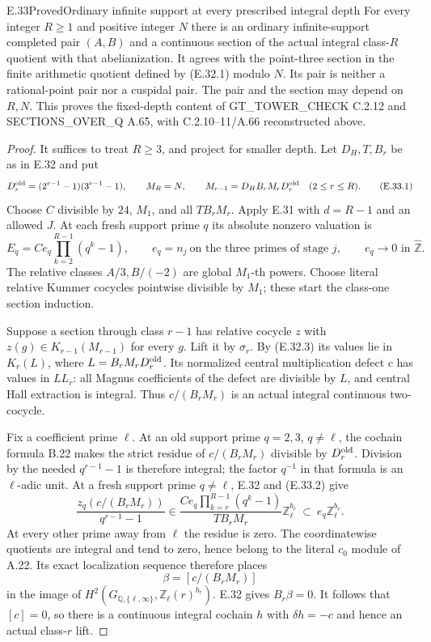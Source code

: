 \begin{result}{E.33}{Proved}{Ordinary infinite support at every prescribed integral depth}
\label{coh:fixed-depth}
For every integer $R\ge1$ and positive integer $N$ there is an ordinary
infinite-support completed pair $(A,B)$ and a continuous section of
the actual integral class-$R$ quotient with that abelianization.
It agrees with the point-three section in the finite arithmetic quotient
defined by (E.32.1) modulo $N$.  Its pair is neither a rational-point
pair nor a cuspidal pair.  The pair and the section may depend on $R,N$.
This proves the fixed-depth content of GT\_TOWER\_CHECK C.2.12 and
SECTIONS\_OVER\_Q A.65, with C.2.10--11/A.66 reconstructed above.
\end{result}
\begin{proof}
It suffices to treat $R\ge3$, and project for smaller depth.  Let
$D_H,T,B_r$ be as in E.32 and put
\[
 D_r^{\rm old}=(2^{r-1}-1)(3^{r-1}-1),\qquad
 M_R=N,\qquad M_{r-1}=D_H B_r M_rD_r^{\rm old}\quad(2\le r\le R).
 \tag{E.33.1}
\]
Choose $C$ divisible by $24$, $M_1$, and all $TB_rM_r$.
Apply E.31 with $d=R-1$ and an allowed $J$.  At each fresh support
prime $q$ its absolute nonzero valuation is
\[
 E_q=C e_q\prod_{k=2}^{R-1}(q^k-1),\qquad
 e_q=n_j\ \text{on the three primes of stage }j,\qquad
 e_q\longrightarrow0\text{ in }\widehat{\mathbb Z}.
 \tag{E.33.2}
\]
The relative classes $A/3,B/(-2)$ are global $M_1$-th powers.  Choose
literal relative Kummer cocycles pointwise divisible by $M_1$;
these start the class-one section induction.

Suppose a section through class $r-1$ has relative cocycle $z$ with
$z(g)\in K_{r-1}(M_{r-1})$ for every $g$.  Lift it by $\sigma_r$.
By (E.32.3) its values lie in $K_r(L)$, where
$L=B_rM_rD_r^{\rm old}$.  Its normalized central multiplication
defect $c$ has values in $LL_r$: all Magnus coefficients of the defect
are divisible by $L$, and central Hall extraction is integral.
Thus $c/(B_rM_r)$ is an actual integral continuous two-cocycle.

Fix a coefficient prime $\ell$.  At an old support prime $q=2,3$,
$q\ne\ell$, the cochain formula B.22 makes the strict residue of
$c/(B_rM_r)$ divisible by $D_r^{\rm old}$.  Division by the needed
$q^{r-1}-1$ is therefore integral; the factor $q^{-1}$ in that formula
is an $\ell$-adic unit.  At a fresh support prime $q\ne\ell$, E.32
and (E.33.2) give
\[
 \frac{z_q(c/(B_rM_r))}{q^{r-1}-1}
 \in
 \frac{C e_q\prod_{k=r}^{R-1}(q^k-1)}{TB_rM_r}
                   \mathbb Z_\ell^{b_r}
 \ \subset\ e_q\mathbb Z_\ell^{b_r}.
 \tag{E.33.3}
\]
At every other prime away from $\ell$ the residue is zero.  The
coordinatewise quotients are integral and tend to zero, hence belong
to the literal $c_0$ module of A.22.  Its exact localization sequence
therefore places
\[
                         \beta=[c/(B_rM_r)]
 \tag{E.33.4}
\]
in the image of $H^2(G_{\mathbb Q,\{\ell,\infty\}},
\mathbb Z_\ell(r)^{b_r})$.  E.32 gives $B_r\beta=0$.
It follows that $[c]=0$, so there is a continuous integral cochain
$h$ with $\delta h=-c$ and hence an actual class-$r$ lift.


\end{proof}
